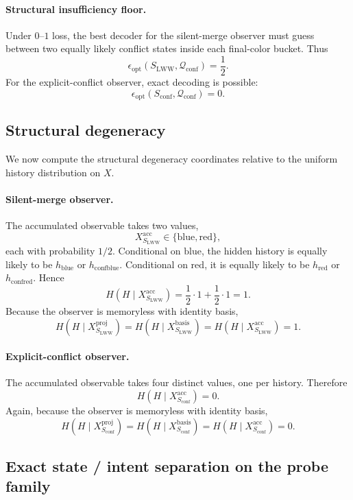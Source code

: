 \documentclass[11pt,twoside]{article}
\theoremstyle{definition}
\newcommand{\proj}{\mathrm{proj}}
\newcommand{\basis}{\mathrm{basis}}
\newcommand{\acc}{\mathrm{acc}}
\newcommand{\blue}{\mathrm{blue}}
\newcommand{\red}{\mathrm{red}}
\newcommand{\conf}{\mathrm{conf}}
\begin{document}
\paragraph{Structural insufficiency floor.}
Under \(0\)--\(1\) loss, the best decoder for the silent-merge observer must guess between two equally likely conflict states inside each final-color bucket. Thus
\[
  \epsilon_{\mathrm{opt}}(S_{\mathrm{LWW}},\mathcal{Q}_{\mathrm{conf}})
  = \frac12.
\]
For the explicit-conflict observer, exact decoding is possible:
\[
  \epsilon_{\mathrm{opt}}(S_{\mathrm{conf}},\mathcal{Q}_{\mathrm{conf}})
  = 0.
\]

\subsection{Structural degeneracy}
\label{app:conflict-structural-degeneracy}

We now compute the structural degeneracy coordinates relative to the uniform history distribution on \(X\).

\paragraph{Silent-merge observer.}
The accumulated observable takes two values,
\[
  X_{S_{\mathrm{LWW}}}^{\acc}\in\{\blue,\red\},
\]
each with probability \(1/2\). Conditional on \(\blue\), the hidden history is equally likely to be \(h_{\blue}\) or \(h_{\conf\blue}\). Conditional on \(\red\), it is equally likely to be \(h_{\red}\) or \(h_{\conf\red}\). Hence
\[
  H(H\mid X_{S_{\mathrm{LWW}}}^{\acc})
  =
  \frac12\cdot 1 + \frac12\cdot 1
  =
  1.
\]
Because the observer is memoryless with identity basis,
\[
  H(H\mid X_{S_{\mathrm{LWW}}}^{\proj})
  =
  H(H\mid X_{S_{\mathrm{LWW}}}^{\basis})
  =
  H(H\mid X_{S_{\mathrm{LWW}}}^{\acc})
  =
  1.
\]

\paragraph{Explicit-conflict observer.}
The accumulated observable takes four distinct values, one per history. Therefore
\[
  H(H\mid X_{S_{\mathrm{conf}}}^{\acc})=0.
\]
Again, because the observer is memoryless with identity basis,
\[
  H(H\mid X_{S_{\mathrm{conf}}}^{\proj})
  =
  H(H\mid X_{S_{\mathrm{conf}}}^{\basis})
  =
  H(H\mid X_{S_{\mathrm{conf}}}^{\acc})
  =
  0.
\]

\subsection{Exact state / intent separation on the probe family}
\label{app:conflict-state-intent-separation}
\end{document}
